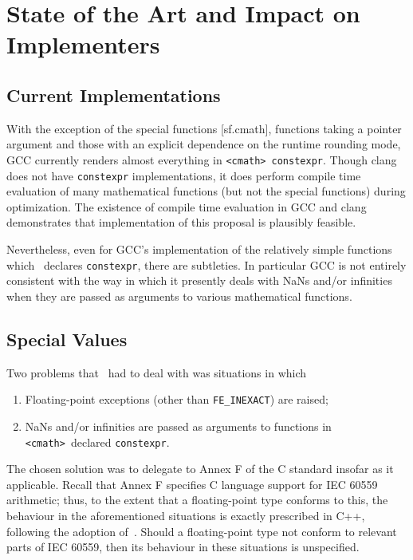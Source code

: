 \documentclass[prd,twocolumn,amsmath,amssymb,nofootinbib,eqsecnum]{revtex4-1}
\newcommand{\constexpr}{\code{constexpr}\xspace}
\newcommand{\code}[1]{{\tt #1}}
\newcommand{\header}[1]{{\tt <#1>}}
\newcommand{\cmath}{\header{cmath}}
\newcommand{\FEINEXACT}{{\tt FE\_INEXACT}}
\begin{document}
\section{State of the Art and Impact on Implementers}

\subsection{Current Implementations}

With the exception of the special functions [sf.cmath], functions taking a pointer argument and those with an explicit dependence on the runtime rounding mode, GCC currently renders almost everything in \cmath\ \constexpr. Though clang does not have \constexpr implementations, it does perform compile time evaluation of many mathematical functions (but not the special functions) during optimization. The existence of compile time evaluation in GCC and clang demonstrates that implementation of this proposal is plausibly feasible. 

Nevertheless, even for GCC's implementation of the relatively simple functions which~\cite{Rosten-constexpr} declares \constexpr, there are subtleties. In particular GCC is not entirely consistent with the way in which it presently deals with NaNs and/or infinities when they are passed as arguments to various mathematical functions.


\subsection{Special Values}

Two problems that~\cite{Rosten-constexpr} had to deal with was situations in which
\begin{enumerate}

\item Floating-point exceptions (other than \FEINEXACT) are raised;

\item NaNs and/or infinities are passed as arguments to functions in \cmath\ declared \constexpr.

\end{enumerate}
The chosen solution was to delegate to Annex F of the C standard insofar as it applicable.
Recall that Annex F specifies C language support for IEC 60559 arithmetic; thus, to the extent that a
floating-point type conforms to this, the behaviour in the aforementioned situations is 
exactly prescribed in C++, following the adoption of~\cite{Rosten-constexpr}. Should a
floating-point type not conform to relevant parts of IEC 60559, then its behaviour in these
situations is unspecified.
\end{document}

